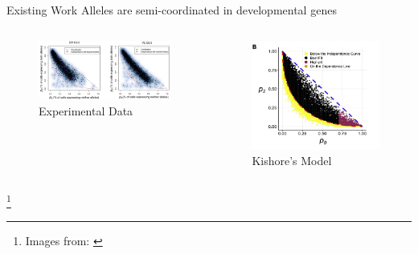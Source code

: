 \documentclass[aspectratio=169,9pt]{beamer}
\begin{document}
\begin{frame}{Existing Work}
  Alleles are semi-coordinated in developmental genes
  \begin{columns}
    \begin{column}{0.63\textwidth}
      \begin{figure}
        \centering
        \includegraphics[width=\textwidth]{hemant}
        \caption{Experimental Data}
      \end{figure}
    \end{column}
    \begin{column}{0.33\textwidth}
      \begin{figure}
        \centering
        \includegraphics[width=\textwidth]{kishore}
        \caption{Kishore's Model}
      \end{figure}
    \end{column}
  \end{columns}
\footnote{Images from: \cite{Naik2021}}
\end{frame}
\end{document}
